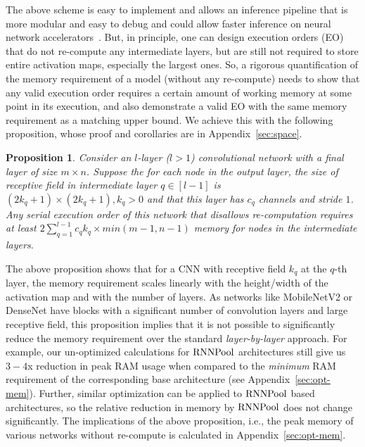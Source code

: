 \documentclass[10pt]{article}
\newcommand{\rpool}{\ensuremath{{\rm RNNPool}}\xspace}
\newtheorem{proposition}{Proposition}
\begin{document}
The above scheme is easy to implement and allows an inference pipeline
that is more modular and easy to debug and could allow faster
inference on neural network accelerators~\citep{tpu}. But, in
principle, one can design execution orders (EO) that do not re-compute
any intermediate layers, but are still not required to store entire
activation maps, especially the largest ones. So, a rigorous
quantification of the memory requirement of a model (without any
re-compute) needs to show that any valid execution order requires a
certain amount of working memory at some point in its execution, and
also demonstrate a valid EO with the same memory requirement as a
matching upper bound. We achieve this with the following proposition,
whose proof and corollaries are in Appendix~\ref{sec:space}.
\vspace{-1mm}
\begin{proposition}
	\label{prop:mem}
	Consider an $l$-layer ($l>1$) convolutional network with a
        final layer of size $m\times n$.  Suppose the for each node in
        the output layer, the size of receptive field in intermediate
        layer $q \in[l-1]$ is $(2k_q+1)\times(2k_q+1), k_q>0$ and that
        this layer has $c_q$ channels and stride $1$.  Any serial
        execution order of this network that disallows re-computation
        requires at least $2 \sum_{q=1}^{l-1} c_q k_q \times
        min(m-1,n-1)$ memory for nodes in the intermediate layers.
\end{proposition}
\vspace{-1mm}
The above proposition shows that for a CNN with receptive field $k_q$
at the $q$-th layer, the memory requirement scales linearly with the
height/width of the activation map and with the number of layers. As
networks like MobileNetV2 or DenseNet have blocks with a significant
number of convolution layers and large receptive field, this
proposition implies that it is not possible to significantly reduce
the memory requirement over the standard {\em layer-by-layer}
approach. For example, our un-optimized calculations for \rpool
architectures still give us $3-4$x reduction in peak RAM usage when
compared to the {\em minimum} RAM requirement of the corresponding
base architecture (see Appendix~\ref{sec:opt-mem}). Further, similar
optimization can be applied to \rpool based architectures, so the relative reduction in memory by \rpool does not change
significantly. The implications of the above proposition, i.e., the
peak memory of various networks without re-compute is calculated in
Appendix~\ref{sec:opt-mem}.
\end{document}
